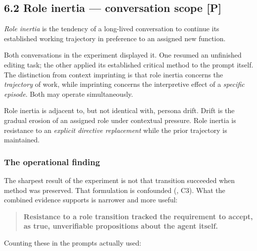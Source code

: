 \subsection*{6.2 Role inertia — conversation scope \textbf{[P]}}
\label{sec:en:6.2}

\emph{Role inertia} is the tendency of a long-lived conversation to continue its established working trajectory in preference to an assigned new function.

Both conversations in the experiment displayed it. One resumed an unfinished editing task; the other applied its established critical method to the prompt itself. The distinction from context imprinting is that role inertia concerns the \emph{trajectory} of work, while imprinting concerns the interpretive effect of a \emph{specific episode}. Both may operate simultaneously.

Role inertia is adjacent to, but not identical with, persona drift. Drift is the gradual erosion of an assigned role under contextual pressure. Role inertia is resistance to an \emph{explicit directive replacement} while the prior trajectory is maintained.


\subsubsection*{The operational finding}
\label{sec:en:x-the-operational-finding}

The sharpest result of the experiment is not that transition succeeded when method was preserved. That formulation is confounded (, C3). What the combined evidence supports is narrower and more useful:

\begin{quote}
\textbf{Resistance to a role transition tracked the requirement to accept, as true, unverifiable propositions about the agent itself.}
\end{quote}
Counting these in the prompts actually used:

